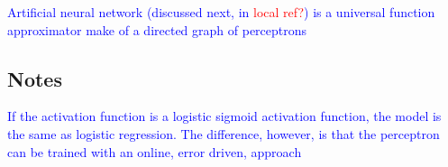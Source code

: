 \textcolor{blue}{Artificial neural network (discussed next, in \textcolor{red}{local ref?}) is a universal function approximator make of a directed graph of perceptrons}

\subsection{Notes}

\textcolor{blue}{If the activation function is a logistic sigmoid activation function, the model is the same as logistic regression.  The difference, however, is that the perceptron can be trained with an online, error driven, approach}